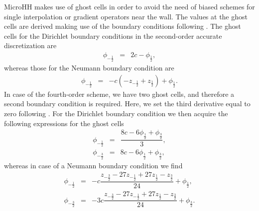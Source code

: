 \documentclass[gmd,manuscript]{copernicus}
\begin{document}
MicroHH makes use of ghost cells in order to avoid the need of biased schemes for single interpolation or gradient operators near the wall. The values at the ghost cells are derived making use of the boundary conditions following \citet{Morinishi1998}. The ghost cells for the Dirichlet boundary conditions in the second-order accurate discretization are
\begin{eqnarray}
\phi_{-\frac{1}{2}} & = & 2 c - \phi_{\frac{1}{2}},
\end{eqnarray}
whereas those for the Neumann boundary condition are
\begin{eqnarray}
\phi_{-\frac{1}{2}} & = & -c \left( - z_{-\frac{1}{2}} + z_{\frac{1}{2}} \right) + \phi_{\frac{1}{2}}.
\end{eqnarray}
In case of the fourth-order scheme, we have two ghost cells, and therefore a second boundary condition is required. Here, we set the third derivative equal to zero following \citep{Morinishi1998}. For the Dirichlet boundary condition we then acquire the following expressions for the ghost cells
\begin{eqnarray}
\phi_{-\frac{1}{2}} & = & \dfrac{8 c - 6 \phi_{\frac{1}{2}} + \phi_{\frac{3}{2}}}{3},\\
\phi_{-\frac{3}{2}} & = & 8 c - 6 \phi_{\frac{1}{2}} + \phi_{\frac{3}{2}},
\end{eqnarray}
whereas in case of a Neumann boundary condition we find
\begin{eqnarray}
\phi_{-\frac{1}{2}} & = & -c  \dfrac{z_{-\frac{3}{2}} - 27 z_{-\frac{1}{2}} + 27 z_{\frac{1}{2}} - z_{\frac{3}{2}}}{24} + \phi_{\frac{1}{2}},\\
\phi_{-\frac{3}{2}} & = & -3c \dfrac{z_{-\frac{3}{2}} - 27 z_{-\frac{1}{2}} + 27 z_{\frac{1}{2}} - z_{\frac{3}{2}}}{24} + \phi_{\frac{3}{2}}.
\end{eqnarray}
\end{document}
